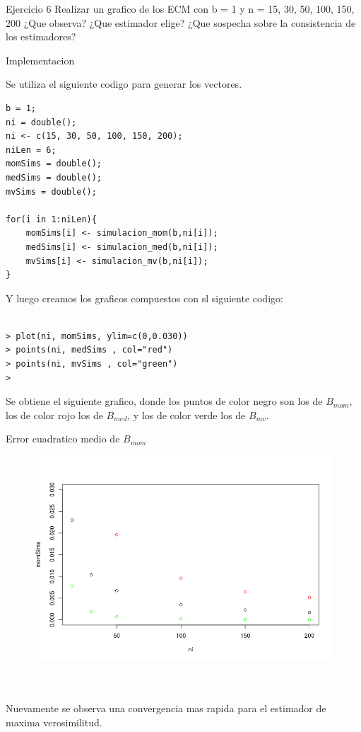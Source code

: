 



\begin{section}{Ejercicio 6}
Realizar un grafico de los ECM con b = 1 y n = 15, 30, 50, 100, 150, 200 ¿Que observa? ¿Que
estimador elige? ¿Que sospecha sobre la consistencia de los estimadores?

\begin{subsection}{Implementacion}


Se utiliza el siguiente codigo para generar los vectores.
\begin{verbatim}
b = 1;
ni = double();
ni <- c(15, 30, 50, 100, 150, 200);
niLen = 6;
momSims = double();
medSims = double();
mvSims = double();

for(i in 1:niLen){
	momSims[i] <- simulacion_mom(b,ni[i]);
	medSims[i] <- simulacion_med(b,ni[i]);
	mvSims[i] <- simulacion_mv(b,ni[i]);
}

\end{verbatim}

Y luego creamos los graficos compuestos con sl siguiente codigo:

\begin{verbatim}

> plot(ni, momSims, ylim=c(0,0.030))
> points(ni, medSims , col="red")
> points(ni, mvSims , col="green")
> 

\end{verbatim}

Se obtiene el siguiente grafico, donde los puntos de color negro son los de $B_{mom}$, los de color rojo los de $B_{med}$, y los de color verde los de $B_{mv}$.


Error cuadratico medio de $B_{mom}$
\begin{figure}[H]
\includegraphics[scale=0.65]{plots/combNPlot.png}
\centering
\end{figure}
~\\
~\\



Nuevamente se observa una convergencia mas rapida para el estimador de maxima verosimilitud.
\end{subsection}
\end{section}